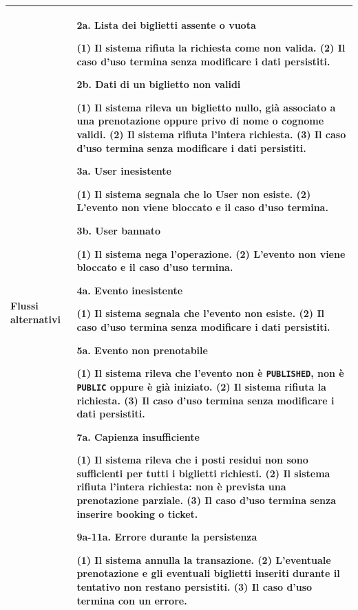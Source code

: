 \begin{tabularx}{\textwidth}{>{\columncolor{etichetteUC}\raggedright\arraybackslash\sffamily\bfseries\color{black!75}}p{2.5cm}>{\raggedright\arraybackslash}X}
Flussi alternativi & \textbf{2a. Lista dei biglietti assente o vuota} \par (1) Il sistema rifiuta la richiesta come non valida. (2) Il caso d'uso termina senza modificare i dati persistiti. \par\vspace{1pt} \textbf{2b. Dati di un biglietto non validi} \par (1) Il sistema rileva un biglietto nullo, già associato a una prenotazione oppure privo di nome o cognome validi. (2) Il sistema rifiuta l'intera richiesta. (3) Il caso d'uso termina senza modificare i dati persistiti. \par\vspace{1pt} \textbf{3a. User inesistente} \par (1) Il sistema segnala che lo User non esiste. (2) L'evento non viene bloccato e il caso d'uso termina. \par\vspace{1pt} \textbf{3b. User bannato} \par (1) Il sistema nega l'operazione. (2) L'evento non viene bloccato e il caso d'uso termina. \par\vspace{1pt} \textbf{4a. Evento inesistente} \par (1) Il sistema segnala che l'evento non esiste. (2) Il caso d'uso termina senza modificare i dati persistiti. \par\vspace{1pt} \textbf{5a. Evento non prenotabile} \par (1) Il sistema rileva che l'evento non è \texttt{PUBLISHED}, non è \texttt{PUBLIC} oppure è già iniziato. (2) Il sistema rifiuta la richiesta. (3) Il caso d'uso termina senza modificare i dati persistiti. \par\vspace{1pt} \textbf{7a. Capienza insufficiente} \par (1) Il sistema rileva che i posti residui non sono sufficienti per tutti i biglietti richiesti. (2) Il sistema rifiuta l'intera richiesta: non è prevista una prenotazione parziale. (3) Il caso d'uso termina senza inserire booking o ticket. \par\vspace{1pt} \textbf{9a-11a. Errore durante la persistenza} \par (1) Il sistema annulla la transazione. (2) L'eventuale prenotazione e gli eventuali biglietti inseriti durante il tentativo non restano persistiti. (3) Il caso d'uso termina con un errore. \\[1pt] \hline

\end{tabularx}
